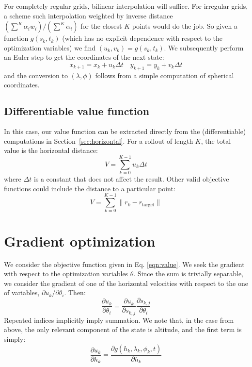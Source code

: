 \documentclass[11pt]{scrartcl} %
\begin{document}
For completely regular grids, bilinear interpolation will suffice. For irregular grids, a scheme such interpolation weighted by inverse distance $(\sum^K \alpha_i w_i)/(\sum^K \alpha_i)$ for the closest $K$ points would do the job. So given a function $g(s_k, t_k)$ (which has no explicit dependence with respect to the optimization variables) we find $(u_k, v_k) = g(s_k, t_k)$. We subsequently perform an Euler step to get the coordinates of the next state:
\[x_{k+1} = x_k + u_k\Delta t\quad y_{k+1} = y_k + v_k\Delta t\]
and the conversion to $(\lambda, \phi)$ follows from a simple computation of spherical coordinates.

\subsection{Differentiable value function}
In this case, our value function can be extracted directly from the (differentiable) computations in Section~\ref{sec:horizontal}. For a rollout of length $K$, the total value is the horizontal distance:
\begin{equation}
V = \sum_{k=0}^{K-1} u_k \Delta t\label{eqn:value}
\end{equation}
where $\Delta t$ is a constant that does not affect the result. Other valid objective functions could include the distance to a particular point:
\[V = \sum_{k=0}^{K-1} \lVert r_k - r_\text{target}\rVert\]

\section{Gradient optimization}
We consider the objective function given in Eq. \ref{eqn:value}. We seek the gradient with respect to the optimization variables $\theta$. Since the sum is trivially separable, we consider the gradient of one of the horizontal velocities with respect to the one of variables, $\partial u_k/\partial \theta_i$. Then:
\[\frac{\partial u_k}{\partial \theta_i} = \frac{\partial u_k}{\partial s_{k,j}}\frac{\partial s_{k,j}}{\partial \theta_i}\]
Repeated indices implicitly imply summation. We note that, in the case from above, the only relevant component of the state is altitude, and the first term is simply:
\[\frac{\partial u_k}{\partial h_k} = \frac{\partial g(h_k, \lambda_k, \phi_k, t)}{\partial h_k}\]
\end{document}
